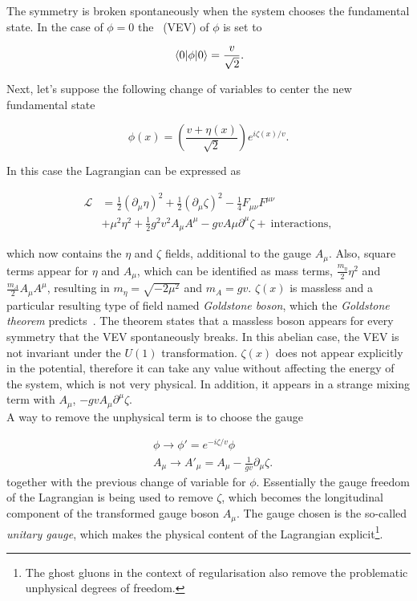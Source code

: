 The symmetry is broken spontaneously when the system chooses the fundamental state. In the case of $\phi=0$ the \textit{}~(\acrshort{VEV})
of $\phi$ is set to

\begin{equation}
    \expval{\phi}{0} = \frac{v}{\sqrt{2}}.
\end{equation}

Next, let's suppose the following change of variables to center the new fundamental state

\begin{equation}
    \phi(x)=\left( \frac{v+\eta(x)}{\sqrt{2}} \right) e^{i\zeta(x)/v}.
\end{equation}

In this case the Lagrangian can be expressed as

\begin{equation}
\begin{split}
\mathcal{L} &= \frac{1}{2}(\partial_\mu\eta)^2 + \frac{1}{2}(\partial_\mu\zeta)^2 - \frac{1}{4}F_{\mu\nu}F^{\mu\nu}\\
&+\mu^2\eta^2 + \frac{1}{2}g^2v^2A_\mu A^\mu - gv A\mu \partial^\mu\zeta +\ \text{interactions},
\end{split}
\end{equation}

which now contains the $\eta$ and $\zeta$ fields, additional to the gauge $A_\mu$. Also, square terms appear for $\eta$ and $A_\mu$,
which can be identified as mass terms, $\frac{m_\eta}{2}\eta^2$ and $\frac{m_A}{2}A_\mu A^\mu$,
resulting in $m_\eta=\sqrt{-2\mu^2}$ and $m_A=gv$. $\zeta(x)$ is massless and a particular resulting type of field named
\textit{Goldstone boson}, which the \textit{Goldstone theorem} predicts~\cite{Goldstone:1962es}.
The theorem states that a massless boson appears for every symmetry that the \acrshort{VEV} spontaneously breaks.
In this abelian case, the \acrshort{VEV} is not invariant under the $U(1)$ transformation.
$\zeta(x)$ does not appear explicitly in the potential, therefore it can take any value without affecting the energy of the system,
which is not very physical. In addition, it appears in a strange mixing term with $A_\mu$, $-gvA_\mu\partial^\mu\zeta$.\\

A way to remove the unphysical term is to choose the gauge

\begin{equation}
\begin{split}
    &\phi\rightarrow\phi'=e^{-i\zeta/v}\phi \\
    &A_\mu\rightarrow A'_\mu = A_\mu-\frac{1}{gv}\partial_\mu\zeta.
\end{split}
\end{equation}
together with the previous change of variable for $\phi$. Essentially the gauge freedom of the Lagrangian is being used to remove $\zeta$,
which becomes the longitudinal component of the transformed gauge boson $A_\mu$.
The gauge chosen is the so-called \textit{unitary gauge}, which makes the physical content of the Lagrangian explicit\footnote{The ghost gluons in the context of regularisation also remove the problematic unphysical degrees of freedom.}.\\

